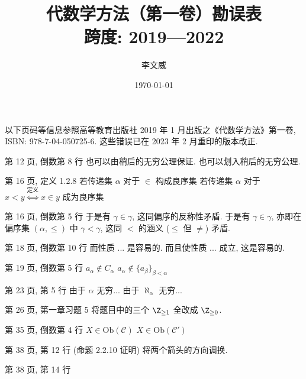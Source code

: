 \documentclass{AJerrata}
\title{\bfseries 代数学方法（第一卷）勘误表 \\ 跨度: 2019---2022 }
\author{李文威}
\date{\today}
\begin{document}
	\maketitle
	以下页码等信息参照高等教育出版社 2019 年 1 月出版之《代数学方法》第一卷, ISBN: 978-7-04-050725-6. 这些错误已在 2023 年 2 月重印的版本改正.

	\begin{Errata}
		\item[第 12 页, 倒数第 8 行]
		\Orig 也可以由稍后的无穷公理保证.
		\Corr 也可以划入稍后的无穷公理.
		
		\item[第 16 页, 定义 1.2.8]
		\Orig 若传递集 $\alpha$ 对于 $\in$ 构成良序集
		\Corr 若传递集 $\alpha$ 对于 $x < y \stackrel{\text{定义}}{\iff} x \in y$ 成为良序集
		
		\item[第 16 页, 倒数第 5 行]
		\Orig 于是有 $\gamma \in \gamma$, 这同偏序的反称性矛盾.
		\Corr 于是有 $\gamma \in \gamma$, 亦即在偏序集 $(\alpha, \leq)$ 中 $\gamma < \gamma$, 这同 $<$ 的涵义 ($\leq$ 但 $\neq$) 矛盾.
		
		\item[第 18 页, 倒数第 10 行]
		\Orig 而性质 ... 是容易的.
		\Corr 而且使性质 ... 成立, 这是容易的.
		
        \item[第 19 页, 倒数第 5 行]
        \Orig $a_\alpha \notin C_\alpha$
        \Corr $a_\alpha \notin \{ a_\beta \}_{\beta < \alpha}$

		\item[第 23 页, 第 5 行]
		\Orig 由于 $\alpha$ 无穷...
		\Corr 由于 $\aleph_\alpha$ 无穷...

		\item[第 26 页, 第一章习题 5]
		将题目中的三个 $\Z_{\geq 1}$ 全改成 $\Z_{\geq 0}$.

        \item[第 35 页, 倒数第 4 行]
        \Orig $X \in \mathrm{Ob}(\mathcal{C})$
        \Corr $X \in \mathrm{Ob}(\mathcal{C}')$

        \item[第 38 页, 第 12 行 (命题 2.2.10 证明)]
        将两个箭头的方向调换.

		\item[第 38 页, 第 14 行]
		

\end{Errata}
\end{document}
